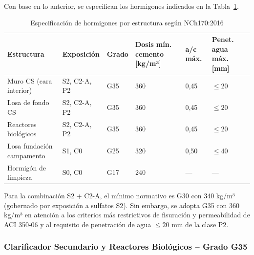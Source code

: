 Con base en lo anterior, se especifican los hormigones indicados en la Tabla~\ref{tab:hormigones}.

\begin{table}[H]
  \centering
  \caption{Especificación de hormigones por estructura según NCh170:2016}
  \label{tab:hormigones}
  \begin{tabular}{p{3.5cm} p{2.2cm} p{1.5cm} p{2.2cm} p{2.2cm} p{2.5cm}}
    \toprule
    Estructura         & Exposición & Grado & Dosis mín. cemento [kg/m³] & a/c máx. & Penet. agua máx. [mm] \\
    \midrule
    Muro CS (cara interior)     & S2, C2-A, P2        & G35            & 360                                  & 0{,}45            & $\leq 20$ \\
    Losa de fondo CS            & S2, C2-A, P2        & G35            & 360                                  & 0{,}45            & $\leq 20$ \\
    Reactores biológicos        & S2, C2-A, P2        & G35            & 360                                  & 0{,}45            & $\leq 20$ \\
    Losa fundación campamento   & S1, C0              & G25            & 320                                  & 0{,}50            & $\leq 40$ \\
    Hormigón de limpieza        & S0, C0              & G17            & 240                                  & ---               & ---       \\
    \bottomrule
  \end{tabular}
\end{table}

Para la combinación S2 + C2-A, el mínimo normativo es G30 con 340 kg/m³ (gobernado por exposición a sulfatos S2). Sin embargo, se adopta G35 con 360 kg/m³ en atención a los criterios más restrictivos de fisuración y permeabilidad de ACI 350-06 y al requisito de penetración de agua $\leq 20$ mm de la clase P2.

\subsubsection{Clarificador Secundario y Reactores Biológicos -- Grado G35}

